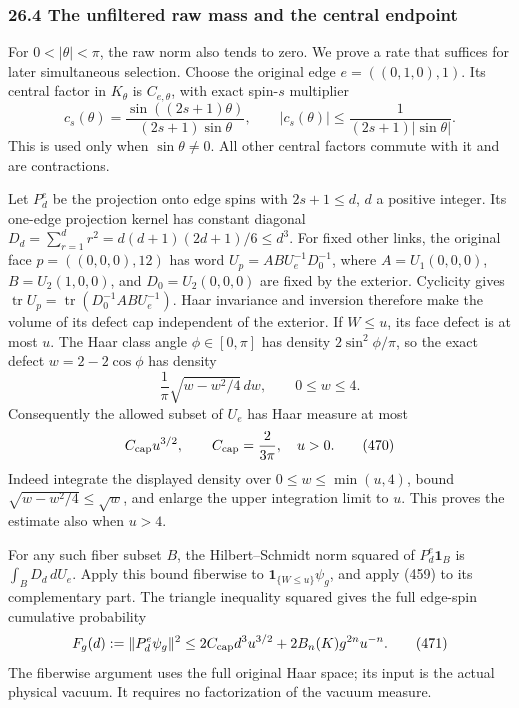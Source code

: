 \documentclass[
  11pt,
]{article}
\begin{document}
\subsubsection{26.4 The unfiltered raw mass and the central
endpoint}\label{the-unfiltered-raw-mass-and-the-central-endpoint}

For \(0<|\theta|<\pi\), the raw norm also tends to zero. We prove a rate
that suffices for later simultaneous selection. Choose the original edge
\(e=((0,1,0),1)\). Its central factor in \(K_\theta\) is
\(C_{e,\theta}\), with exact spin-\(s\) multiplier \[
 c_s(\theta)=\frac{\sin((2s+1)\theta)}
                    {(2s+1)\sin\theta},\qquad
 |c_s(\theta)|\le\frac1{(2s+1)|\sin\theta|}.
 \tag{469}
\] This is used only when \(\sin\theta\ne0\). All other central factors
commute with it and are contractions.

Let \(P_d^e\) be the projection onto edge spins with \(2s+1\le d\),
\(d\) a positive integer. Its one-edge projection kernel has constant
diagonal \(D_d=\sum_{r=1}^dr^2=d(d+1)(2d+1)/6\le d^3\). For fixed other
links, the original face \(p=((0,0,0),12)\) has word
\(U_p=A B U_e^{-1}D_0^{-1}\), where \(A=U_1(0,0,0)\), \(B=U_2(1,0,0)\),
and \(D_0=U_2(0,0,0)\) are fixed by the exterior. Cyclicity gives
\(\operatorname{tr}U_p=\operatorname{tr}(D_0^{-1}ABU_e^{-1})\). Haar
invariance and inversion therefore make the volume of its defect cap
independent of the exterior. If \(W\le u\), its face defect is at most
\(u\). The Haar class angle \(\phi\in[0,\pi]\) has density
\(2\sin^2\phi/\pi\), so the exact defect \(w=2-2\cos\phi\) has density
\[
 \frac1\pi\sqrt{w-w^2/4}\,dw,\qquad 0\le w\le4 .
\] Consequently the allowed subset of \(U_e\) has Haar measure at most
\[
 C_{\rm cap}u^{3/2},\qquad C_{\rm cap}=\frac2{3\pi},
                         \quad u>0.
 \tag{470}
\] Indeed integrate the displayed density over \(0\le w\le\min(u,4)\),
bound \(\sqrt{w-w^2/4}\le\sqrt w\), and enlarge the upper integration
limit to \(u\). This proves the estimate also when \(u>4\).

For any such fiber subset \(B\), the Hilbert--Schmidt norm squared of
\(P_d^e\mathbf1_B\) is \(\int_BD_d\,dU_e\). Apply this bound fiberwise
to \(\mathbf1_{\{W\le u\}}\psi_g\), and apply (459) to its complementary
part. The triangle inequality squared gives the full edge-spin
cumulative probability \[
 F_g(d):=\|P_d^e\psi_g\|^2
       \le2C_{\rm cap}d^3u^{3/2}
                  +2B_n(K)g^{2n}u^{-n}.
 \tag{471}
\] The fiberwise argument uses the full original Haar space; its input
is the actual physical vacuum. It requires no factorization of the
vacuum measure.
\end{document}
